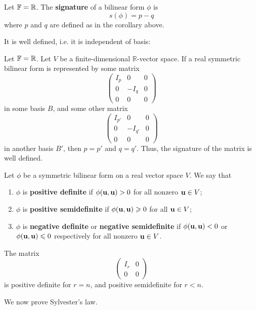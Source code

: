\documentclass[a4paper]{article}
\begin{document}
\begin{definition}
	Let \( {\mathbb{F}} = \mathbb R \).
	The \textbf{signature} of a bilinear form \( \phi \) is
	\[
		s(\phi) = p - q
	\]
	where \( p \) and \( q \) are defined as in the corollary above.
\end{definition}
It is well defined, i.e. it is independent of basis:
\begin{theorem}
	Let \( {\mathbb{F}} = \mathbb R \).
	Let \( V \) be a finite-dimensional \( \mathbb R \)-vector space.
	If a real symmetric bilinear form is represented by some matrix
	\[
		\begin{pmatrix}
			I_p & 0    & 0 \\
			0   & -I_q & 0 \\
			0   & 0    & 0
		\end{pmatrix}
	\]
	in some basis \( B \), and some other matrix
	\[
		\begin{pmatrix}
			I_{p'} & 0       & 0 \\
			0      & -I_{q'} & 0 \\
			0      & 0       & 0
		\end{pmatrix}
	\]
	in another basis \( B' \), then \( p = p' \) and \( q = q' \).
	Thus, the signature of the matrix is well defined.
\end{theorem}
\begin{definition}
	Let \( \phi \) be a symmetric bilinear form on a real vector space \( V \).
	We say that
	\begin{enumerate}
		\item \( \phi \) is \textbf{positive definite} if \( \phi({\bf u},{\bf u}) > 0 \) for all nonzero \( {\bf u} \in V \);
		\item \( \phi \) is \textbf{positive semidefinite} if \( \phi({\bf u},{\bf u}) \geqslant 0 \) for all \( {\bf u} \in V \);
		\item \( \phi \) is \textbf{negative definite} or \textbf{negative semidefinite} if \( \phi({\bf u},{\bf u}) < 0 \) or \( \phi({\bf u},{\bf u}) \leqslant 0 \) respectively for all nonzero \( {\bf u} \in V \).
	\end{enumerate}
\end{definition}
\begin{example}
	The matrix
	\[
		\begin{pmatrix}
			I_r & 0 \\
			0   & 0
		\end{pmatrix}
	\]
	is positive definite for \( r = n \), and positive semidefinite for \( r < n \).
\end{example}
\noindent We now prove Sylvester's law.
\end{document}
